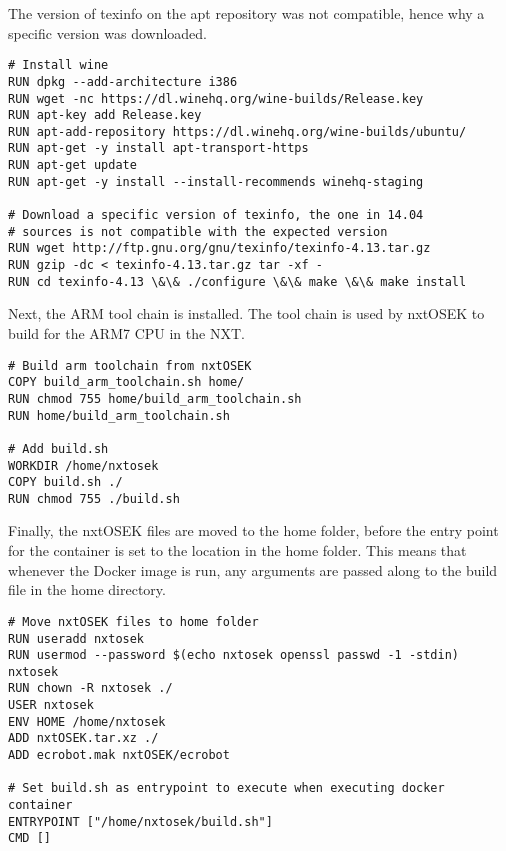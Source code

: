 The version of texinfo on the apt repository was not compatible, hence why a specific version was downloaded.

\begin{lstlisting}[language=docker,label={lst:dockerimplementation2},caption={Installation of Wine and texinfo}]
# Install wine
RUN dpkg --add-architecture i386
RUN wget -nc https://dl.winehq.org/wine-builds/Release.key
RUN apt-key add Release.key
RUN apt-add-repository https://dl.winehq.org/wine-builds/ubuntu/
RUN apt-get -y install apt-transport-https
RUN apt-get update
RUN apt-get -y install --install-recommends winehq-staging

# Download a specific version of texinfo, the one in 14.04
# sources is not compatible with the expected version
RUN wget http://ftp.gnu.org/gnu/texinfo/texinfo-4.13.tar.gz
RUN gzip -dc < texinfo-4.13.tar.gz tar -xf -
RUN cd texinfo-4.13 \&\& ./configure \&\& make \&\& make install
\end{lstlisting}
Next, the ARM tool chain is installed.
The tool chain is used by nxtOSEK to build for the ARM7 CPU in the NXT.
\begin{lstlisting}[language=docker,label={lst:dockerimplementation3},caption={Building the ARM toolchain}]
# Build arm toolchain from nxtOSEK
COPY build_arm_toolchain.sh home/
RUN chmod 755 home/build_arm_toolchain.sh
RUN home/build_arm_toolchain.sh

# Add build.sh
WORKDIR /home/nxtosek
COPY build.sh ./
RUN chmod 755 ./build.sh
\end{lstlisting}

Finally, the nxtOSEK files are moved to the home folder, before the entry point for the container is set to the location in the home folder.
This means that whenever the Docker image is run, any arguments are passed along to the build file in the home directory.

\begin{lstlisting}[language=docker,label={lst:dockerimplementation4},caption={Moving the nxtOSEK files and setting the entry point}]
# Move nxtOSEK files to home folder
RUN useradd nxtosek
RUN usermod --password $(echo nxtosek openssl passwd -1 -stdin) nxtosek
RUN chown -R nxtosek ./
USER nxtosek
ENV HOME /home/nxtosek
ADD nxtOSEK.tar.xz ./
ADD ecrobot.mak nxtOSEK/ecrobot

# Set build.sh as entrypoint to execute when executing docker container
ENTRYPOINT ["/home/nxtosek/build.sh"]
CMD []
\end{lstlisting}

